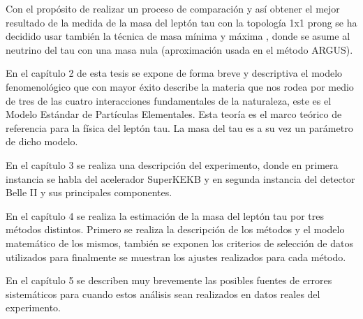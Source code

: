 Con el propósito de realizar un proceso de comparación y así obtener el mejor resultado de la medida de la masa del leptón tau con la topología 1x1 prong se ha decidido usar también la técnica de masa mínima y máxima \cite{PhysRevD.102.115001}, donde se asume al neutrino del tau con una masa nula (aproximación usada en el método ARGUS).

En el capítulo 2 de esta tesis se expone de forma breve y descriptiva el modelo fenomenológico que con mayor éxito describe la materia que nos rodea por medio de tres de las cuatro interacciones fundamentales de la naturaleza, este es el Modelo Estándar de Partículas Elementales. Esta teoría es el marco teórico de referencia para la física del leptón tau. La masa del tau es a su vez un parámetro de dicho modelo.

En el capítulo 3 se realiza una descripción del experimento, donde en primera instancia se habla del acelerador SuperKEKB y en segunda instancia del detector Belle II y sus principales componentes.

En el capítulo 4 se realiza la estimación de la masa del leptón tau por tres métodos distintos. Primero se realiza la descripción de los métodos y el modelo matemático de los mismos, también se exponen los criterios de selección de datos utilizados para finalmente se muestran los ajustes realizados para cada método.

En el capítulo 5 se describen muy brevemente las posibles fuentes de errores sistemáticos para cuando estos análisis sean realizados en datos reales del experimento.
